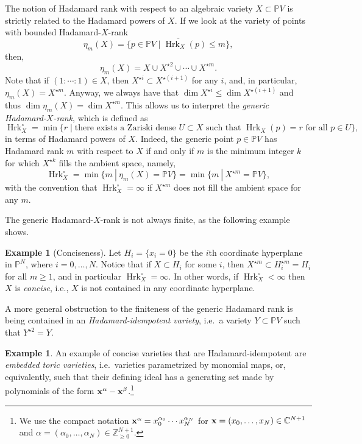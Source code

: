 \documentclass{amsart}
\theoremstyle{plain}
\numberwithin{theorem}{section}
\theoremstyle{definition}
\newtheorem{example}[theorem]{Example}
\newcommand{\bbC}{\mathbb{C}}
\newcommand{\bbP}{\mathbb{P}}
\newcommand{\bbZ}{\mathbb{Z}}
\newcommand{\Hrk}{\operatorname{Hrk}}
\begin{document}
The notion of Hadamard rank with respect to an algebraic variety $X \subset \bbP V$ is strictly related to the Hadamard powers of $X$. If we look at the variety of points with bounded Hadamard-$X$-rank
\[
    \eta_m(X) = \overline{\{p \in \bbP V \mid \Hrk_X(p)\leq m\}},
\]
then, 
\[
    \eta_m(X) = X \cup X^{\star 2} \cup \cdots \cup X^{\star m}.
\]
Note that if $(1:\cdots:1) \in X$, then $X^{\star i} \subset X^{\star (i+1)}$ for any $i$, and, in particular, $\eta_m(X)=X^{\star m}$. Anyway, we always have that $\dim X^{\star i} \leq \dim X^{\star (i+1)}$ and thus $\dim \eta_m(X) = \dim X^{\star m}$. This allows us to interpret the \emph{generic Hadamard-$X$-rank}, which is defined as
\[
    \Hrk_X^\circ = \min\{r \mid \text{there exists a Zariski dense $U\subset X$ such that }\Hrk_X(p) = r \text{ for all } p \in U\},
\]
in terms of Hadamard powers of $X$. Indeed, the generic point $p \in \bbP V$ has Hadamard rank $m$ with respect to $X$ if and only if $m$ is the minimum integer $k$ for which $X^{\star k}$ fills the ambient space, namely, 
    \[
        \Hrk_X^\circ = \min\{ m \ | \ \eta_m(X) = \bbP V\} = \min\{ m \ | \ X^{\star m} = \bbP V\},
    \]
    with the convention that $\Hrk_X^\circ = \infty$ if $X^{\star m}$ does not fill the ambient space for any $m$.

The generic Hadamard-$X$-rank is not always finite, as the following example shows.

\begin{example}[Conciseness]\label{rmk:concise}
    Let $H_i = \{x_i = 0\}$ be the $i$th coordinate hyperplane in $\bbP^N$, where $i = 0,\ldots, N$. Notice that if $X \subset H_i$ for some $i$, then $X^{\star m} \subset H_i^{\star m} = H_i$ for all $m\geq 1$, and in particular $\Hrk_X^\circ = \infty$. In other words, if $\Hrk_X^\circ < \infty$ then $X$ is \emph{concise}, i.e., $X$ is not contained in any coordinate hyperplane.
\end{example}
A more general obstruction to the finiteness of the generic Hadamard rank is being contained in an {\em Hadamard-idempotent variety}, i.e.\ a variety $Y \subset \bbP V$ such that $Y^{\star 2} = Y$.
\begin{example}
    An example of concise varieties that are Hadamard-idempotent are {\em embedded toric varieties}, i.e.\ varieties parametrized by monomial maps, or, equivalently, such that their defining ideal has a generating set made by polynomials of the form ${\bf x}^\alpha - {\bf x}^\beta$.\footnote{We use the compact notation ${\bf x}^\alpha = x_0^{\alpha_0} \cdots x_N^{\alpha_N}$ for ${\bf x} =(x_0,\ldots,x_N) \in \bbC^{N+1}$ and $\alpha = (\alpha_0,\ldots,\alpha_N) \in \bbZ_{\geq 0}^{N+1}$.}
\end{example}
\end{document}
